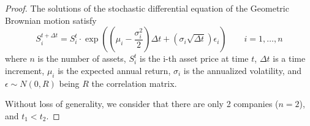 \documentclass[11pt,fleqn]{book} %
\begin{document}
\begin{proof}
	The solutions of the stochastic differential equation of the Geometric 
	Brownian motion satisfy
	\begin{displaymath}
		S_i^{t+\Delta t} = S_i^t \cdot \exp\left(
		\left(\mu_i - \frac{\sigma_i^2}{2}\right) \Delta t +
		\left(\sigma_i \sqrt{\Delta t}\right) \epsilon_i
		\right) \qquad i=1,\dots,n
	\end{displaymath}
	where $n$ is the number of assets, $S_i^t$ is the i-th asset price at 
	time $t$, $\Delta t$ is a time increment, $\mu_i$ is the expected annual 
	return, $\sigma_i$ is the annualized volatility, and $\epsilon \sim N(0,R)$ 
	being $R$ the correlation matrix.

	Without loss of generality, we consider that there are only 2 companies
	($n=2$), and $t_1 < t_2$. 
	

\end{proof}
\end{document}
